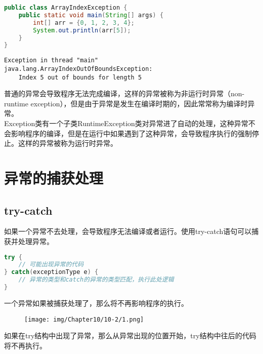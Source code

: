 
\begin{lstlisting}[language=Java]
public class ArrayIndexException {
    public static void main(String[] args) {
        int[] arr = {0, 1, 2, 3, 4};
        System.out.println(arr[5]);
    }
}
\end{lstlisting}

\begin{tcolorbox}
    \begin{verbatim}
Exception in thread "main"
java.lang.ArrayIndexOutOfBoundsException:
    Index 5 out of bounds for length 5
	\end{verbatim}
\end{tcolorbox}

普通的异常会导致程序无法完成编译，这样的异常被称为非运行时异常（non-runtime exception），但是由于异常是发生在编译时期的，因此常常称为编译时异常。\\

Exception类有一个子类RuntimeException类对异常进了自动的处理，这种异常不会影响程序的编译，但是在运行中如果遇到了这种异常，会导致程序执行的强制停止。这样的异常被称为运行时异常。

\newpage

\section{异常的捕获处理}

\subsection{try-catch}

如果一个异常不去处理，会导致程序无法编译或者运行。使用try-catch语句可以捕获并处理异常。

\vspace{-0.5cm}

\begin{lstlisting}[language=Java]
try {
    // 可能出现异常的代码
} catch(exceptionType e) {
    // 异常的类型和catch的异常的类型匹配，执行此处逻辑
}
\end{lstlisting}

一个异常如果被捕获处理了，那么将不再影响程序的执行。

\begin{figure}[H]
    \centering
    \texttt{[image: img/Chapter10/10-2/1.png]}
\end{figure}

如果在try结构中出现了异常，那么从异常出现的位置开始，try结构中往后的代码将不再执行。\\

